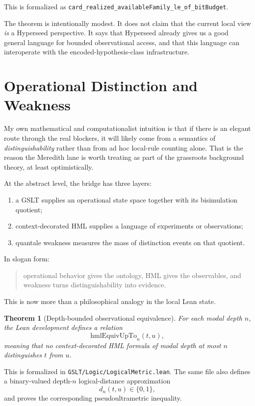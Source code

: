 \documentclass[11pt]{article}
\newtheorem{theorem}{Theorem}[section]
\theoremstyle{remark}
\begin{document}
\noindent
This is formalized as
\texttt{card\_realized\_availableFamily\_le\_of\_bitBudget}.

The theorem is intentionally modest.  It does not claim that the current local
view \emph{is} a Hyperseed perspective.  It says that Hyperseed already gives us a
good general language for bounded observational access, and that this language can
interoperate with the encoded-hypothesis-class infrastructure.

\section{Operational Distinction and Weakness}

My own mathematical and computationalist intuition is that if there is an elegant
route through the real blockers, it will likely come from a semantics of
\emph{distinguishability} rather than from ad hoc local-rule counting alone.
That is the reason the Meredith lane is worth treating as part of the grassroots
background theory, at least optimistically.

At the abstract level, the bridge has three layers:
\begin{enumerate}[leftmargin=1.5em]
  \item a GSLT supplies an operational state space together with its bisimulation
  quotient;
  \item context-decorated HML supplies a language of experiments or observations;
  \item quantale weakness measures the mass of distinction events on that quotient.
\end{enumerate}

In slogan form:
\begin{quote}
operational behavior gives the ontology, HML gives the observables, and weakness
turns distinguishability into evidence.
\end{quote}

This is now more than a philosophical analogy in the local Lean state.

\begin{theorem}[Depth-bounded observational equivalence]
For each modal depth \(n\), the Lean development defines a relation
\[
  \mathrm{hmlEquivUpTo}_n(t,u),
\]
meaning that no context-decorated HML formula of modal depth at most \(n\)
distinguishes \(t\) from \(u\).
\end{theorem}

\noindent
This is formalized in \texttt{GSLT/Logic/LogicalMetric.lean}.  The same file also
defines a binary-valued depth-\(n\) logical-distance approximation
\[
  d_n(t,u) \in \{0,1\},
\]
and proves the corresponding pseudoultrametric inequality.
\end{document}
